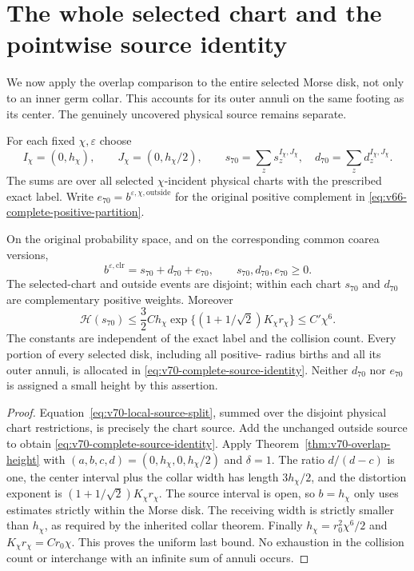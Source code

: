\section{The whole selected chart and the pointwise source identity}
\label{sec:v70-whole-chart}
We now apply the overlap comparison to the entire selected Morse
disk, not only to an inner germ collar. This accounts for its outer
annuli on the same footing as its center. The genuinely uncovered
physical source remains separate.

For each fixed $\chi,\varepsilon$ choose
\[
 I_\chi=(0,h_\chi),\qquad J_\chi=(0,h_\chi/2),
 \qquad
 s_{70}=\sum_zs_z^{I_\chi,J_\chi},\quad
 d_{70}=\sum_zd_z^{I_\chi,J_\chi}.
\]
The sums are over all selected $\chi$-incident physical charts with
the prescribed exact label. Write
$e_{70}=b^{\varepsilon,\chi,\mathrm{outside}}$ for the original
positive complement in \eqref{eq:v66-complete-positive-partition}.

\begin{theorem}
\label{thm:v70-whole-chart-allocation}
On the original probability space, and on the corresponding common
coarea versions,
\begin{equation}\label{eq:v70-complete-source-identity}
 b^{\varepsilon,\mathrm{clr}}=s_{70}+d_{70}+e_{70},
 \qquad s_{70},d_{70},e_{70}\ge0.
\end{equation}
The selected-chart and outside events are disjoint; within each chart
$s_{70}$ and $d_{70}$ are complementary positive weights. Moreover
\begin{equation}\label{eq:v70-whole-chart-height}
 \mathcal H(s_{70})
 \le\frac32Ch_\chi
       \exp\{(1+1/\sqrt2)K_\chi r_\chi\}
 \le C'\chi^6.
\end{equation}
The constants are independent of the exact label and the collision
count. Every portion of every selected disk, including all positive-
radius births and all its outer annuli, is allocated in
\eqref{eq:v70-complete-source-identity}. Neither $d_{70}$ nor
$e_{70}$ is assigned a small height by this assertion.
\end{theorem}
\begin{proof}
Equation~\eqref{eq:v70-local-source-split}, summed over the disjoint
physical chart restrictions, is precisely the chart source. Add the
unchanged outside source to obtain \eqref{eq:v70-complete-source-identity}.
Apply Theorem~\ref{thm:v70-overlap-height} with
$(a,b,c,d)=(0,h_\chi,0,h_\chi/2)$ and $\delta=1$. The ratio
$d/(d-c)$ is one, the center interval plus the collar width has
length $3h_\chi/2$, and the distortion exponent is
$(1+1/\sqrt2)K_\chi r_\chi$. The source interval is open, so
$b=h_\chi$ only uses estimates strictly within the Morse disk.
The receiving width is strictly smaller than $h_\chi$, as required
by the inherited collar theorem. Finally
$h_\chi=r_0^2\chi^6/2$ and $K_\chi r_\chi=Cr_0\chi$.
This proves the uniform last bound. No exhaustion in the collision
count or interchange with an infinite sum of annuli occurs.
\end{proof}

